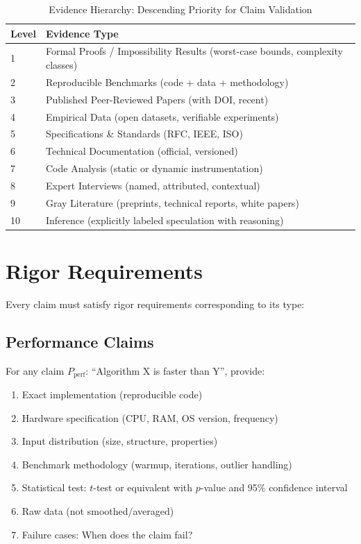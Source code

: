 \documentclass[12pt,twoside,openright]{book}
\theoremstyle{plain}
\theoremstyle{definition}
\theoremstyle{remark}
\begin{document}
\begin{table}[h]
\centering
\begin{tabular}{|p{}|p{}|}
\hline
\textbf{Level} & \textbf{Evidence Type} \\
\hline
1 & Formal Proofs / Impossibility Results (worst-case bounds, complexity classes) \\
\hline
2 & Reproducible Benchmarks (code + data + methodology) \\
\hline
3 & Published Peer-Reviewed Papers (with DOI, recent) \\
\hline
4 & Empirical Data (open datasets, verifiable experiments) \\
\hline
5 & Specifications \& Standards (RFC, IEEE, ISO) \\
\hline
6 & Technical Documentation (official, versioned) \\
\hline
7 & Code Analysis (static or dynamic instrumentation) \\
\hline
8 & Expert Interviews (named, attributed, contextual) \\
\hline
9 & Gray Literature (preprints, technical reports, white papers) \\
\hline
10 & Inference (explicitly labeled speculation with reasoning) \\
\hline
\end{tabular}
\caption{Evidence Hierarchy: Descending Priority for Claim Validation}
\label{tab:evidence_hierarchy}
\end{table}

\section{Rigor Requirements}

Every claim must satisfy rigor requirements corresponding to its type:

\subsection{Performance Claims}

For any claim \(P_{\text{perf}}\): ``Algorithm X is faster than Y'', provide:

\begin{enumerate}
  \item Exact implementation (reproducible code)
  \item Hardware specification (CPU, RAM, OS version, frequency)
  \item Input distribution (size, structure, properties)
  \item Benchmark methodology (warmup, iterations, outlier handling)
  \item Statistical test: $t$-test or equivalent with $p$-value and 95\% confidence interval
  \item Raw data (not smoothed/averaged)
  \item Failure cases: When does the claim fail?
\end{enumerate}
\end{document}
